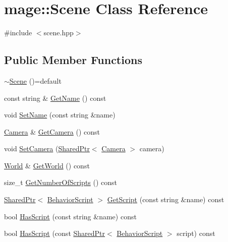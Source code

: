 \hypertarget{classmage_1_1_scene}{}\section{mage\+:\+:Scene Class Reference}
\label{classmage_1_1_scene}


{\ttfamily \#include $<$scene.\+hpp$>$}

\subsection*{Public Member Functions}
\begin{DoxyCompactItemize}
\item 
\hyperlink{classmage_1_1_scene_a6b97d0181285a69bd0a9789f534abc43}{$\sim$\+Scene} ()=default
\item 
const string \& \hyperlink{classmage_1_1_scene_a251ff8f6ce0da5c55ee31e3450b5fb9a}{Get\+Name} () const
\item 
void \hyperlink{classmage_1_1_scene_a9b7c1c2f84cc3b3c5ff3de4f29d830e9}{Set\+Name} (const string \&name)
\item 
\hyperlink{classmage_1_1_camera}{Camera} \& \hyperlink{classmage_1_1_scene_a8b2ad419541a51353d6f56ba12f43d79}{Get\+Camera} () const
\item 
void \hyperlink{classmage_1_1_scene_a57718151e0102306b3abb22da45ae27a}{Set\+Camera} (\hyperlink{namespacemage_a1e01ae66713838a7a67d30e44c67703e}{Shared\+Ptr}$<$ \hyperlink{classmage_1_1_camera}{Camera} $>$ camera)
\item 
\hyperlink{classmage_1_1_world}{World} \& \hyperlink{classmage_1_1_scene_a0365a6a2e83519ad33280cc607408b4a}{Get\+World} () const
\item 
size\+\_\+t \hyperlink{classmage_1_1_scene_a799ac8ddd90d24f6c3c208942e4f159c}{Get\+Number\+Of\+Scripts} () const
\item 
\hyperlink{namespacemage_a1e01ae66713838a7a67d30e44c67703e}{Shared\+Ptr}$<$ \hyperlink{classmage_1_1_behavior_script}{Behavior\+Script} $>$ \hyperlink{classmage_1_1_scene_aa5d10620d1cf62ba268095f7a2cd2191}{Get\+Script} (const string \&name) const
\item 
bool \hyperlink{classmage_1_1_scene_ad87f96d612fa5087ad3ddcbb73ef05a4}{Has\+Script} (const string \&name) const
\item 
bool \hyperlink{classmage_1_1_scene_a31469e19b181d0cb08bf10c554d28a6d}{Has\+Script} (const \hyperlink{namespacemage_a1e01ae66713838a7a67d30e44c67703e}{Shared\+Ptr}$<$ \hyperlink{classmage_1_1_behavior_script}{Behavior\+Script} $>$ script) const

\end{DoxyCompactItemize}
